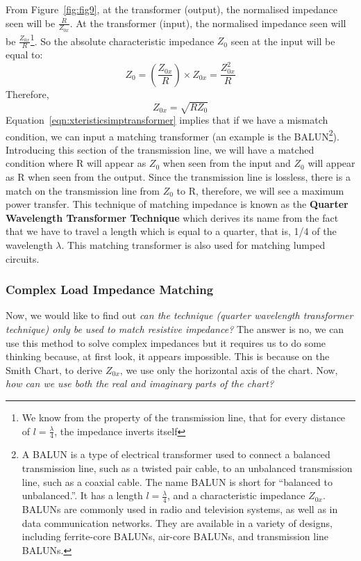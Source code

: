From Figure~\ref{fig:fig9}, at the transformer (output), the normalised impedance seen will be $\frac{R}{Z_{0x}}$. At the transformer (input), the normalised impedance seen will be $\frac{Z_{0x}}{R}$\footnote{
We know from the property of the transmission line, that for every distance of $l = \frac{\lambda}{4}$, the impedance inverts itself
}. So the absolute characteristic impedance $ Z_0$ seen at the input will be equal to: 
\begin{dmath*}
Z_0=\left(\frac{Z_{0x}}{R}\right)\times Z_{0x}
=\frac{Z_{0x}^2}{R}
\end{dmath*}
Therefore,
\begin{equation}
Z_{0x}=\sqrt{RZ_0}
\label{eqn:xteristicsimptransformer}
\end{equation}
Equation~\eqref{eqn:xteristicsimptransformer} implies that if we have a mismatch condition, we can input a matching transformer (an example is the \uppercase{balun}\footnote{
A \uppercase{balun} is a type of electrical transformer used to connect a balanced transmission line, such as a twisted pair cable, to an unbalanced transmission line, such as a coaxial cable. The name \uppercase{balun} is short for \textquotedblleft balanced to unbalanced.\textquotedblright. It has a length $l=\frac{\lambda}{4}$, and a characteristic impedance $Z_{0x}$. \uppercase{Balun}s are commonly used in radio and television systems, as well as in data communication networks. They are available in a variety of designs, including ferrite-core \uppercase{balun}s, air-core \uppercase{balun}s, and transmission line \uppercase{balun}s.
}). Introducing this section of the transmission line, we will have a matched condition where R will appear as $ Z_0$ when seen from the input and $ Z_0$ will appear as R when seen from the output. Since the transmission line is lossless, there is a match on the transmission line from $ Z_0$ to R, therefore, we will see a maximum power transfer.
This technique of matching impedance is known as the \textbf{Quarter Wavelength Transformer Technique} which derives its name from the fact that we have to travel a length which is equal to a quarter, that is, 1/4 of the wavelength $\lambda$. This matching transformer is also used for matching lumped circuits.

\subsubsection{Complex Load Impedance Matching}
Now, we would like to find out \emph{can the technique (quarter wavelength transformer technique) only be used to match resistive impedance?} The answer is no, we can use this method to solve complex impedances but it requires us to do some thinking because, at first look, it appears impossible. This is because on the Smith Chart, to derive $Z_{0x}$, we use only the horizontal axis of the chart. Now, \emph{how can we use both the real and imaginary parts of the chart?}

